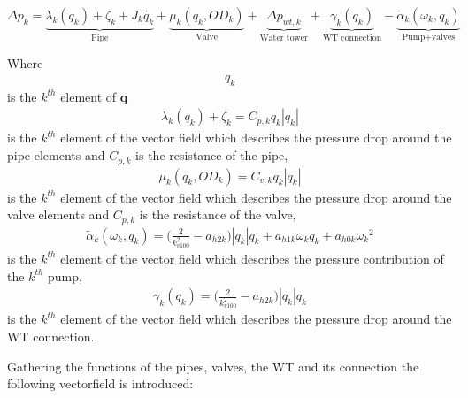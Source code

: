 
\begin{equation}
\label{CompleteModel_extended}
\Delta p_k \!= \! \underbrace{\lambda_k (q_k) \!+ \! \zeta_k \!+ \! J_k \dot{q_k}}_\text{Pipe} \!+ \!\underbrace{\mu_k (q_k,OD_k)}_\text{Valve}\! + \!\underbrace{\Delta p_{wt,k}}_\text{Water tower} \!+\! \underbrace{\gamma_k (q_k)}_\text{WT connection}\! -\! \underbrace{\tilde{\alpha}_k(\omega_k,q_k)}_\text{Pump+valves}
\end{equation}

Where
\begin{align*}
q_k 
\end{align*}
is the $k^{th}$ element of $\bm{q}$
%
\begin{align*}
\lambda_k (q_k) + \zeta_k= C_{p,k} q_k |q_k|
\end{align*}
is the $k^{th}$ element of the vector field which describes the pressure drop around the pipe elements and $C_{p,k}$ is the resistance of the pipe,
%
\begin{align*}
\mu_k (q_k,OD_k) = C_{v,k} q_k |q_k| 
\end{align*}
is the $k^{th}$ element of the vector field which describes the pressure drop around the valve elements and $C_{p,k}$ is the resistance of the valve,
%
\begin{align*}
\tilde{\alpha}_k(\omega_k,q_k) = \Big(\frac{2}{k_{v100}^2} - a_{h2k}\Big)|q_k| q_k + a_{h1k} \omega_{k} q_k + a_{h0k}{\omega_k}^2
\end{align*}
is the $k^{th}$ element of the vector field which describes the pressure contribution of the $k^{th}$ pump,
%
\begin{align*}
\gamma_k (q_k) = \Big(\frac{2}{k_{v100}^2} - a_{h2k}\Big)|q_k| q_k  
\end{align*}
is the $k^{th}$ element of the vector field which describes the pressure drop around the WT connection.

Gathering the functions of the pipes, valves, the WT and its connection the following vectorfield is introduced:

